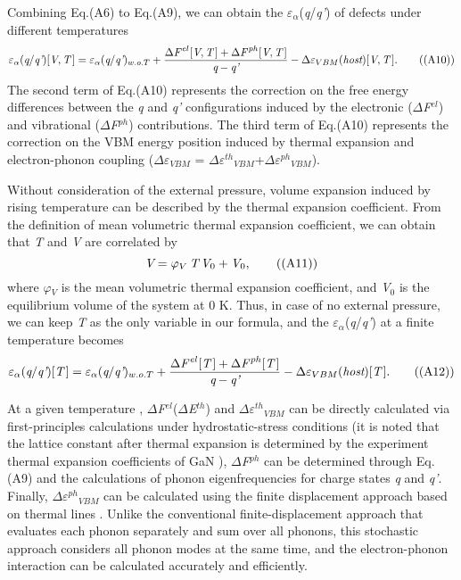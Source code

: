 \documentclass[onecolumn,preprint,superscriptaddress]{revtex4-1}
\begin{document}
Combining Eq.(A6) to Eq.(A9), we can obtain the $\varepsilon$$_{\alpha}$(\emph{q}/\emph{q'}) of defects under different temperatures
\begin{equation}
\varepsilon_{\alpha}(\emph{q}/\emph{q'})[\emph{V},\emph{T}\,] = \varepsilon_{\alpha}(\emph{q}/\emph{q'})_{w.o.T} + \frac{\Delta\emph{F}^{\,el}[\emph{V},\emph{T}\,] + \Delta\emph{F}^{\,ph}[\emph{V},\emph{T}\,]}{\emph{q}-\emph{q'}} - \Delta\varepsilon_{VBM}(\emph{host})[\emph{V},\emph{T}\,].  \tag{(A10)}
\end{equation}
\noindent The second term of Eq.(A10) represents the correction on the free energy differences between the \emph{q} and \emph{q'} configurations induced by the electronic ($\Delta$\emph{F}$^{el}$) and vibrational ($\Delta$\emph{F}$^{ph}$) contributions. The third term of Eq.(A10) represents the correction on the VBM energy position induced by thermal expansion and electron-phonon coupling ($\Delta$$\varepsilon$$_{VBM}$ = $\Delta$$\varepsilon$$^{th}$$_{VBM}$+$\Delta$$\varepsilon$$^{ph}$$_{VBM}$).

Without consideration of the external pressure, volume expansion induced by rising temperature can be described by the thermal expansion coefficient. From the definition of mean volumetric thermal expansion coefficient, we can obtain that \emph{T} and \emph{V} are correlated by \cite{S24}
\begin{equation}
\emph{V}=\varphi_{V}\,\emph{T}\,\emph{V}_{0}+\emph{V}_{0},  \tag{(A11)}
\end{equation}
\noindent where $\varphi$$_{V}$ is the mean volumetric thermal expansion coefficient, and \emph{V}$_{0}$ is the equilibrium volume of the system at 0 K. Thus, in case of no external pressure, we can keep \emph{T} as the only variable in our formula, and the $\varepsilon$$_{\alpha}$(\emph{q}/\emph{q'}) at a finite temperature becomes
\begin{equation}
\varepsilon_{\alpha}(\emph{q}/\emph{q'})[\emph{T}\,] = \varepsilon_{\alpha}(\emph{q}/\emph{q'})_{w.o.T} + \frac{\Delta\emph{F}^{\,el}[\emph{T}\,] + \Delta\emph{F}^{\,ph}[\emph{T}\,]}{\emph{q}-\emph{q'}} - \Delta\varepsilon_{VBM}(\emph{host})[\emph{T}\,].   \tag{(A12)}
\end{equation}

At a given temperature , $\Delta$\emph{F}$^{el}$($\Delta$\emph{E}$^{th}$) and $\Delta$$\varepsilon$$^{th}$$_{VBM}$ can be directly calculated via first-principles calculations under hydrostatic-stress conditions \cite{42,43} (it is noted that the lattice constant after thermal expansion is determined by the experiment thermal expansion coefficients of GaN \cite{S9}), $\Delta$\emph{F}$^{ph}$ can be determined through Eq.(A9) and the calculations of phonon eigenfrequencies for charge states \emph{q} and \emph{q'}. Finally, $\Delta$$\varepsilon$$^{ph}$$_{VBM}$ can be calculated using the finite displacement approach based on thermal lines \cite{S10,S11}. Unlike the conventional finite-displacement approach that evaluates each phonon separately and sum over all phonons, this stochastic approach considers all phonon modes at the same time, and the electron-phonon interaction can be calculated accurately and efficiently.
\end{document}

